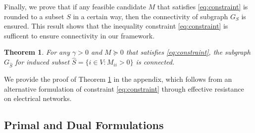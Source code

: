 \documentclass{article}
\newtheorem{theorem}{Theorem}[section]
\begin{document}
Finally, we prove that if any feasible candidate $M$ that satisfies \eqref{eq:constraint} is rounded to a subset $S$ in a certain way, then the connectivity of subgraph $G_S$ is ensured. This result shows that the inequality constraint \eqref{eq:constraint} is sufficent to ensure connectivity in our framework.

\begin{theorem}\label{thm:sufficiency}
  For any $\gamma > 0$ and $M \succeq 0$ that satisfies \eqref{eq:constraint}, the subgraph $G_{\hat{S}}$ for induced subset $\hat{S} = \{i \in V : M_{ii} > 0\}$ is connected.
\end{theorem}

We provide the proof of Theorem \ref{thm:sufficiency} in the appendix, which follows from an alternative formulation of constraint \eqref{eq:constraint} through effective resistance on electrical networks.


\subsection{Primal and Dual Formulations}
\end{document}
